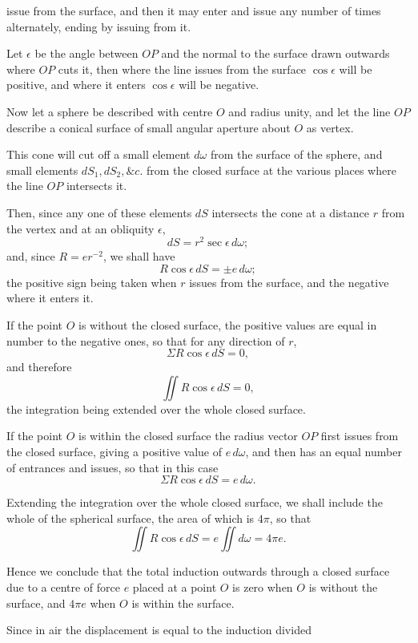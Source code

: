 \documentclass[11pt,a4paper]{article}
\begin{document}
\clearpage
\setcounter{footnote}{0}

issue from the surface, and then it may enter and issue any number of
times alternately, ending by issuing from it.

Let \(\epsilon\) be the angle between \(OP\) and the normal to the surface
drawn outwards where \(OP\) cuts it, then where the line issues from
the surface \(\cos\epsilon\) will be positive, and where it enters
\(\cos\epsilon\) will be negative.

Now let a sphere be described with centre \(O\) and radius unity, and
let the line \(OP\) describe a conical surface of small angular aperture
about \(O\) as vertex.

This cone will cut off a small element \(d\omega\) from the surface of
the sphere, and small elements \(dS_1,dS_2,\&c.\) from the closed
surface at the various places where the line \(OP\) intersects it.

Then, since any one of these elements \(dS\) intersects the cone at a
distance \(r\) from the vertex and at an obliquity \(\epsilon\),
\[
dS=r^2\sec\epsilon\,d\omega;
\]
and, since \(R=er^{-2}\), we shall have
\[
R\cos\epsilon\,dS=\pm e\,d\omega;
\]
the positive sign being taken when \(r\) issues from the surface, and
the negative where it enters it.

If the point \(O\) is without the closed surface, the positive values
are equal in number to the negative ones, so that for any direction of
\(r\),
\[
\Sigma R\cos\epsilon\,dS=0,
\]
and therefore
\[
\iint R\cos\epsilon\,dS=0,
\]
the integration being extended over the whole closed surface.

If the point \(O\) is within the closed surface the radius vector \(OP\)
first issues from the closed surface, giving a positive value of
\(e\,d\omega\), and then has an equal number of entrances and issues, so
that in this case
\[
\Sigma R\cos\epsilon\,dS=e\,d\omega.
\]

Extending the integration over the whole closed surface, we shall include
the whole of the spherical surface, the area of which is \(4\pi\), so
that
\[
\iint R\cos\epsilon\,dS
=
e\iint d\omega
=
4\pi e.
\]

Hence we conclude that the total induction outwards through a closed
surface due to a centre of force \(e\) placed at a point \(O\) is zero
when \(O\) is without the surface, and \(4\pi e\) when \(O\) is within
the surface.

Since in air the displacement is equal to the induction divided
\end{document}
